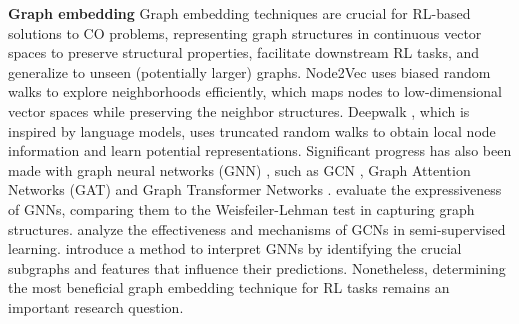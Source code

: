 \textbf{Graph embedding}\quad
Graph embedding techniques are crucial for RL-based solutions to CO problems, representing graph structures in continuous vector spaces to preserve structural properties, facilitate downstream RL tasks, and generalize to unseen (potentially larger) graphs. %
Node2Vec \citep{grover2016node2vec} uses biased random walks to explore neighborhoods efficiently, which maps nodes to low-dimensional vector spaces while preserving the neighbor structures.
Deepwalk \citep{perozzi2014deepwalk}, which is inspired by language models, uses truncated random walks to obtain local node information and learn potential representations. Significant progress has also been made with graph neural networks (GNN) \cite{scarselli2009graph, zhou2020graph, wu2021comprehensive}, such as GCN \cite{kipf2016semi}, Graph Attention Networks (GAT) \cite{velivckovic2018graph} and Graph Transformer Networks \cite{yun2019graph}. \citet{xu2018powerful} evaluate the expressiveness of GNNs, comparing them to the Weisfeiler-Lehman test in capturing graph structures. \citet{li2018deeper} analyze the effectiveness and mechanisms of GCNs in semi-supervised learning. \citet{ying2019gnnexplainer} introduce a method to interpret GNNs by identifying the crucial subgraphs and features that influence their predictions.
Nonetheless, determining the most beneficial graph embedding technique for RL tasks remains an important research question.

